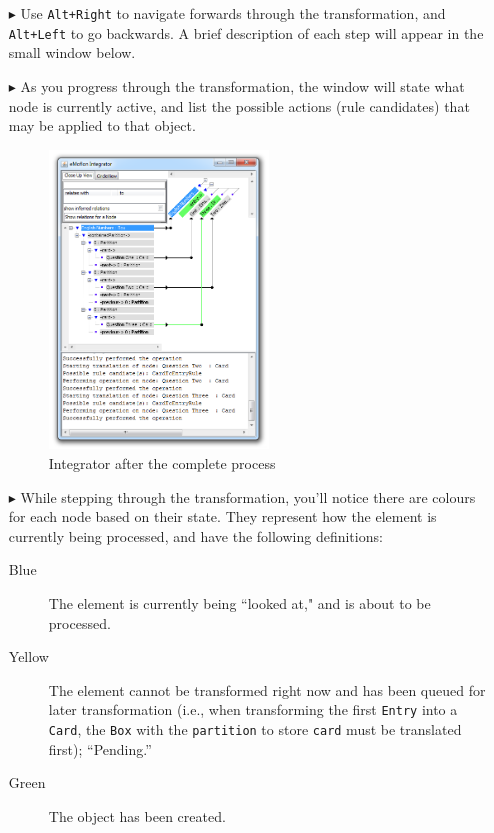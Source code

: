 \begin{itemize}
\item[$\blacktriangleright$]  Use \texttt{Alt+Right} to navigate forwards through the transformation, and \texttt{Alt+Left} to go backwards. A brief description
of each step will appear in the small window below.

\item[$\blacktriangleright$] As you progress through the transformation, the window will state what node is currently active, and list the possible actions
(rule candidates) that may be applied to that object. 

\vspace{0.5cm}

\begin{figure}[h!]
\begin{center}
  \includegraphics[width=0.55\textwidth]{eclipse_integratorPerformed}
  \caption{Integrator after the complete process}
  \label{eclipse:integrator_after_protocol}
\end{center}
\end{figure} 

\item[$\blacktriangleright$] While stepping through the transformation, you'll notice there are colours for each node based on their state. They represent how
the element is currently being processed, and have the following definitions:

\begin{description}
  \item[Blue] The element is currently being ``looked at," and is about to be processed.

  \item[Yellow] The element cannot be transformed right now and has been queued for later transformation (i.e., when transforming the first
  \texttt{Entry} into a \texttt{Card}, the \texttt{Box} with the \texttt{partition} to store \texttt{card} must be translated first); ``Pending.''
  
  \item[Green] The object has been created.

\end{description}

\end{itemize}
